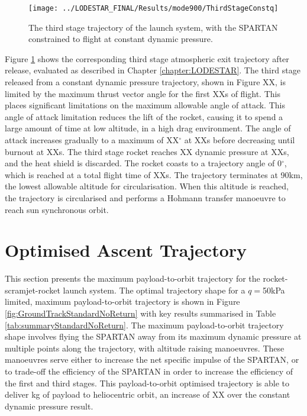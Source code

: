 \begin{figure}[ht!]
\centering
\texttt{[image: ../LODESTAR\_FINAL/Results/mode900/ThirdStageConstq]}
\caption{The third stage trajectory of the launch system, with the SPARTAN constrained to flight at constant dynamic pressure.}
\label{fig:ThirdStageConstq}
\end{figure}

Figure \ref{fig:ThirdStageConstq} shows the corresponding third stage atmospheric exit trajectory after release, evaluated as described in Chapter \ref{chapter:LODESTAR}. The third stage released from a constant dynamic pressure trajectory, shown in Figure XX, is limited by the maximum thrust vector angle for the first XXs of flight. This places significant limitations on the maximum allowable angle of attack. This angle of attack limitation reduces the lift of the rocket, causing it to spend a large amount of time at low altitude, in a high drag environment. The angle of attack increases gradually to a maximum of XX$^\circ$ at XXs before decreasing until burnout at XXs. The third stage rocket reaches XX dynamic pressure at XXs, and the heat shield is discarded. The rocket coasts to a trajectory angle of 0$^\circ$, which is reached at a total flight time of XXs. The trajectory terminates at 90km, the lowest allowable altitude for circularisation. 
When this altitude is reached, the trajectory is circularised and performs a Hohmann transfer manoeuvre to reach sun synchronous orbit.








\section{Optimised Ascent Trajectory}

This section presents the maximum payload-to-orbit trajectory for the rocket-scramjet-rocket launch system. 
The optimal trajectory shape for a $q=$50kPa limited, maximum payload-to-orbit trajectory is shown in Figure \ref{fig:GroundTrackStandardNoReturn} with key results summarised in Table \ref{tab:summaryStandardNoReturn}. The maximum payload-to-orbit trajectory shape involves flying the SPARTAN away from its maximum dynamic pressure at multiple points along the trajectory, with altitude raising manoeuvres. These manoeuvres serve either to increase the net specific impulse of the SPARTAN, or to trade-off the efficiency of the SPARTAN in order to increase the efficiency of the first and third stages. 
This payload-to-orbit optimised trajectory is able to deliver \PayloadToOrbitStandardNoReturn kg of payload to heliocentric orbit, an increase of XX over the constant dynamic pressure result.

